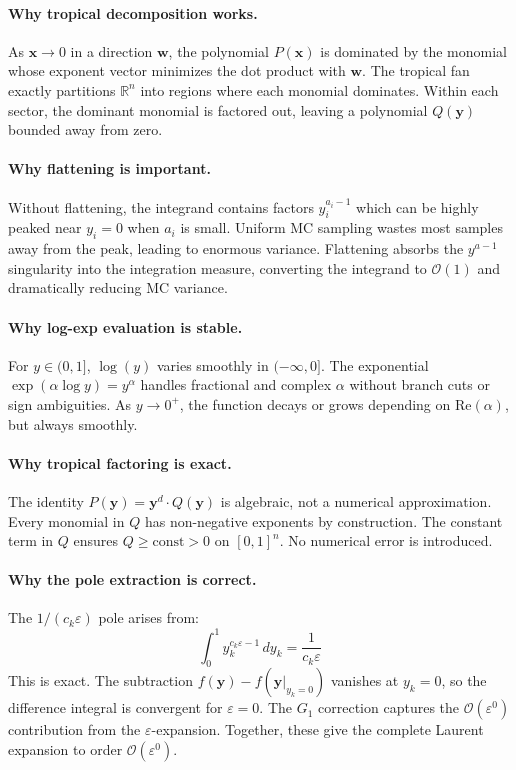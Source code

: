 \documentclass[11pt,a4paper]{article}
\begin{document}
\paragraph{Why tropical decomposition works.}
As $\mathbf{x} \to 0$ in a direction $\mathbf{w}$, the polynomial $P(\mathbf{x})$ is dominated by the monomial whose exponent vector minimizes the dot product with $\mathbf{w}$. The tropical fan exactly partitions $\mathbb{R}^n$ into regions where each monomial dominates. Within each sector, the dominant monomial is factored out, leaving a polynomial $Q(\mathbf{y})$ bounded away from zero.

\paragraph{Why flattening is important.}
Without flattening, the integrand contains factors $y_i^{a_i - 1}$ which can be highly peaked near $y_i = 0$ when $a_i$ is small. Uniform MC sampling wastes most samples away from the peak, leading to enormous variance. Flattening absorbs the $y^{a-1}$ singularity into the integration measure, converting the integrand to $\mathcal{O}(1)$ and dramatically reducing MC variance.

\paragraph{Why log-exp evaluation is stable.}
For $y \in (0, 1]$, $\log(y)$ varies smoothly in $(-\infty, 0]$. The exponential $\exp(\alpha \log y) = y^\alpha$ handles fractional and complex $\alpha$ without branch cuts or sign ambiguities. As $y \to 0^+$, the function decays or grows depending on $\mathrm{Re}(\alpha)$, but always smoothly.

\paragraph{Why tropical factoring is exact.}
The identity $P(\mathbf{y}) = \mathbf{y}^d \cdot Q(\mathbf{y})$ is algebraic, not a numerical approximation. Every monomial in $Q$ has non-negative exponents by construction. The constant term in $Q$ ensures $Q \geq \text{const} > 0$ on $[0,1]^n$. No numerical error is introduced.

\paragraph{Why the pole extraction is correct.}
The $1/(c_k \varepsilon)$ pole arises from:
\begin{equation}
\int_0^1 y_k^{c_k \varepsilon - 1} \, dy_k = \frac{1}{c_k \varepsilon}
\end{equation}
This is exact. The subtraction $f(\mathbf{y}) - f(\mathbf{y}|_{y_k=0})$ vanishes at $y_k = 0$, so the difference integral is convergent for $\varepsilon = 0$. The $G_1$ correction captures the $\mathcal{O}(\varepsilon^0)$ contribution from the $\varepsilon$-expansion. Together, these give the complete Laurent expansion to order $\mathcal{O}(\varepsilon^0)$.
\end{document}
